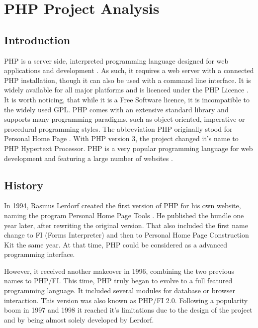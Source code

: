 \section{PHP Project Analysis} %
\label{sec:PHP Project Analysis}


\subsection{Introduction} %
\label{sub:Introduction}

PHP is a server side, interpreted programming language designed for web
applications and development \cite{PHPIntro}. As such, it requires a web server
with a connected PHP installation, though it can also be used with a command
line interface. It is widely available for all major platforms and is licenced
under the PHP Licence \cite{PHPManual}. It is worth noticing, that while it is
a Free Software licence, it is incompatible to the widely used \ac{GPL}. PHP
comes with an extensive standard library and supports many programming
paradigms, such as object oriented, imperative or procedural programming
styles. The abbreviation PHP originally stood for Personal Home Page
\cite{PHPHistory}. With PHP version 3, the project changed it's name to PHP
Hypertext Processor. PHP is a very popular programming language for web
development and featuring a large number of websites
\cite{PHPW3Techs,PHPStats}.


\subsection{History} %
\label{sub:History}

In 1994, Rasmus Lerdorf created the first version of PHP for his own website,
naming the program Personal Home Page Tools \cite{PHPHistory}. He published the
bundle one year later, after rewriting the original version. That also included
the first name change to FI (Forms Interpreter) and then to Personal Home Page
Construction Kit the same year. At that time, PHP could be considered as a
advanced programming interface.

However, it received another makeover in 1996, combining the two previous names
to PHP/FI. This time, PHP truly began to evolve to a full featured programming
language. It included several modules for database or browser interaction. This
version was also known as PHP/FI 2.0. Following a popularity boom in 1997 and
1998 it reached it's limitations due to the design of the project and by being
almost solely developed by Lerdorf.

